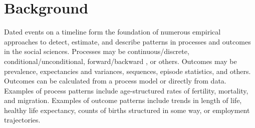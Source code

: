 \documentclass{bmcart}
\begin{document}
\begin{frontmatter}
\begin{abstractbox}


\begin{keyword}
\end{keyword}


\end{abstractbox}
%

\end{frontmatter}



\section*{Background}

Dated events on a timeline form the foundation of numerous empirical approaches to detect, estimate, and describe patterns in processes and outcomes in the social sciences. Processes may be continuous/discrete, conditional/unconditional, forward/backward \citep{brouard2019backward}, or others. Outcomes may be prevalence, expectancies and variances, sequences, episode statistics, and others. Outcomes can be calculated from a process model or directly from data. Examples of process patterns include age-structured rates of fertility, mortality, and migration. Examples of outcome patterns include trends in length of life, healthy life expectancy, counts of births structured in some way, or employment trajectories. 
\end{document}
